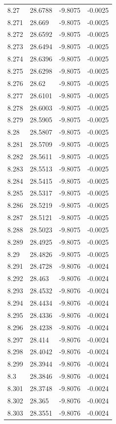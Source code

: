 \begin{tabular}{llll}
8.27 & 28.6788 & -9.8075 & -0.0025 \\
8.271 & 28.669 & -9.8075 & -0.0025 \\
8.272 & 28.6592 & -9.8075 & -0.0025 \\
8.273 & 28.6494 & -9.8075 & -0.0025 \\
8.274 & 28.6396 & -9.8075 & -0.0025 \\
8.275 & 28.6298 & -9.8075 & -0.0025 \\
8.276 & 28.62 & -9.8075 & -0.0025 \\
8.277 & 28.6101 & -9.8075 & -0.0025 \\
8.278 & 28.6003 & -9.8075 & -0.0025 \\
8.279 & 28.5905 & -9.8075 & -0.0025 \\
8.28 & 28.5807 & -9.8075 & -0.0025 \\
8.281 & 28.5709 & -9.8075 & -0.0025 \\
8.282 & 28.5611 & -9.8075 & -0.0025 \\
8.283 & 28.5513 & -9.8075 & -0.0025 \\
8.284 & 28.5415 & -9.8075 & -0.0025 \\
8.285 & 28.5317 & -9.8075 & -0.0025 \\
8.286 & 28.5219 & -9.8075 & -0.0025 \\
8.287 & 28.5121 & -9.8075 & -0.0025 \\
8.288 & 28.5023 & -9.8075 & -0.0025 \\
8.289 & 28.4925 & -9.8075 & -0.0025 \\
8.29 & 28.4826 & -9.8075 & -0.0025 \\
8.291 & 28.4728 & -9.8076 & -0.0024 \\
8.292 & 28.463 & -9.8076 & -0.0024 \\
8.293 & 28.4532 & -9.8076 & -0.0024 \\
8.294 & 28.4434 & -9.8076 & -0.0024 \\
8.295 & 28.4336 & -9.8076 & -0.0024 \\
8.296 & 28.4238 & -9.8076 & -0.0024 \\
8.297 & 28.414 & -9.8076 & -0.0024 \\
8.298 & 28.4042 & -9.8076 & -0.0024 \\
8.299 & 28.3944 & -9.8076 & -0.0024 \\
8.3 & 28.3846 & -9.8076 & -0.0024 \\
8.301 & 28.3748 & -9.8076 & -0.0024 \\
8.302 & 28.365 & -9.8076 & -0.0024 \\
8.303 & 28.3551 & -9.8076 & -0.0024 \\

\end{tabular}
